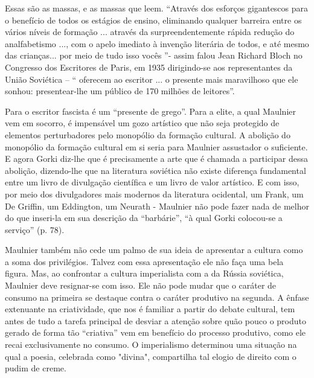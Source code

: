 Essas são as massas, e as massas que leem. ``Através dos esforços
gigantescos para o benefício de todos os estágios de ensino, eliminando
qualquer barreira entre os vários níveis de formação ... através da
surpreendentemente rápida redução do analfabetismo ..., com o apelo
imediato à invenção literária de todos, e até mesmo das crianças... por
meio de tudo isso vocês ''- assim falou Jean Richard Bloch no Congresso
dos Escritores de Paris, em 1935 dirigindo-se aos representantes da
União Soviética -- `` oferecem ao escritor ... o presente mais
maravilhoso que ele sonhou: presentear-lhe um público de 170 milhões de
leitores''.

Para o escritor fascista é um ``presente de grego''. Para a elite, a
qual Maulnier vem em socorro, é impensável um gozo artístico que não
seja protegido de elementos perturbadores pelo monopólio da formação
cultural. A abolição do monopólio da formação cultural em si seria para
Maulnier assustador o suficiente. E agora Gorki diz-lhe que é
precisamente a arte que é chamada a participar dessa abolição,
dizendo-lhe que na literatura soviética não existe diferença fundamental
entre um livro de divulgação científica e um livro de valor artístico. E
com isso, por meio dos divulgadores mais modernos da literatura
ocidental, um Frank, um De Griffin, um Eddington, um Neurath - Maulnier
não pode fazer nada de melhor do que inseri-la em sua descrição da
``barbárie'', ``à qual Gorki colocou-se a serviço'' (p. 78).

Maulnier também não cede um palmo de sua ideia de apresentar a cultura
como a soma dos privilégios. Talvez com essa apresentação ele não faça
uma bela figura. Mas, ao confrontar a cultura imperialista com a da
Rússia soviética, Maulnier deve resignar-se com isso. Ele não pode mudar
que o caráter de consumo na primeira se destaque contra o caráter
produtivo na segunda. A ênfase extenuante na criatividade, que nos é
familiar a partir do debate cultural, tem antes de tudo a tarefa
principal de desviar a atenção sobre quão pouco o produto gerado de
forma tão ``criativa'' vem em benefício do processo produtivo, como ele
recai exclusivamente no consumo. O imperialismo determinou uma situação
na qual a poesia, celebrada como "divina", compartilha tal elogio de
direito com o pudim de creme.

